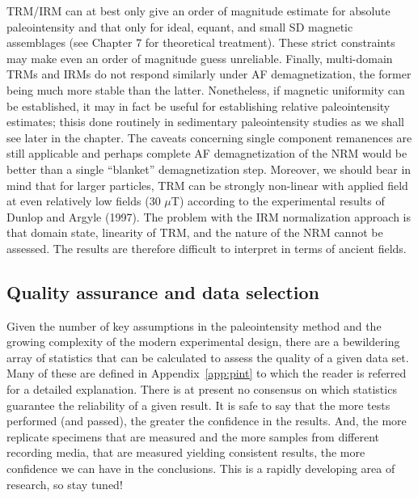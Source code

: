TRM/IRM can   at best only give  an order of magnitude estimate for absolute paleointensity and that only for ideal, equant, and small SD magnetic assemblages (see Chapter 7 for theoretical treatment).  These strict constraints may make even an order of magnitude guess unreliable.  Finally,  multi-domain TRMs and IRMs do not respond similarly under AF demagnetization, the former  being much more stable than the latter.     Nonetheless, if magnetic uniformity can be established, it may in fact be useful for establishing relative paleointensity estimates;  thisis done routinely in sedimentary paleointensity studies as we shall see later in the chapter.  The caveats concerning  single component remanences  are still applicable and perhaps complete AF demagnetization of the NRM would be better than a single ``blanket'' demagnetization step.   Moreover,  we should bear in mind that for larger particles, TRM can be  strongly non-linear with applied field at even relatively low fields (30 $\mu$T) according to the experimental results of
\nocite{dunlop97b}
Dunlop and Argyle (1997).   The problem with the IRM normalization approach is that domain state, linearity of TRM,  and the  nature of the NRM cannot be assessed.  The results are therefore difficult to interpret in terms of ancient fields.  

\subsection{Quality assurance and data selection}

Given the number of key assumptions in the paleointensity method and the growing complexity of the modern experimental design, there are a bewildering array of statistics that can be calculated to assess the quality of a given data set.    Many of these are defined in Appendix~\ref{app:pint} to which the reader is referred for a detailed explanation.    There is at present no consensus on which statistics guarantee the reliability of a given result.    It is safe to say that the more tests performed (and passed), the greater the confidence in the results.  And, the more replicate specimens  that are measured and the more samples from different recording media,  that are measured yielding consistent results, the more confidence we can have in the conclusions.  This is a rapidly developing area of research, so stay tuned!





